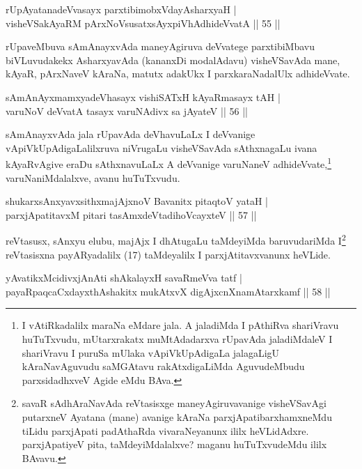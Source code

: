 \begin{shl}
rUpAyatanadeVvasayx parxtibimobxVdayAsharxyaH |\\
visheVSakAyaRM pArxNoV\s susatxsAyxpiVhAdhideVvatA \hfill || 55 ||
\end{shl}

\begin{artha}
rUpaveMbuva sAmAnayxvAda maneyAgiruva deVvatege parxtibiMbavu biVLuvudakekx AsharxyavAda (kananxDi modalAdavu) visheVSavAda mane, kAyaR, pArxNaveV kAraNa, matutx adakUkx I parxkaraNadalUlx adhideVvate.
\end{artha}


\begin{shl}
sAmAnAyxmamxyadeVhasayx vishiSATxH kAyaRmasayx tAH |\\
varuNoV deVvatA tasayx varuNAdivx sa jAyateV \hfill || 56 ||
\end{shl}

\begin{artha}
sAmAnayxvAda jala rUpavAda deVhavuLaLx I deVvanige vApiVkUpAdigaLalilxruva  niVrugaLu visheVSavAda sAthxnagaLu ivana kAyaRvAgive eraDu sAthxnavuLaLx A deVvanige varuNaneV adhideVvate,\footnote{I vAtiRkadalilx maraNa eMdare jala. A jaladiMda I pAthiRva shariVravu huTuTxvudu, mUtarxrakatx muMtAdadarxva rUpavAda jaladiMdaleV I shariVravu I puruSa mUlaka vApiVkUpAdigaLa jalagaLigU kAraNavAguvudu saMGAtavu rakAtxdigaLiMda AguvudeMbudu parxsidadhxveV Agide eMdu BAva.} varuNaniMdalalxve, avanu huTuTxvudu.
\end{artha}

\begin{shl}
shukarxsAnxyavxsithxmajAjxnoV Bavanitx pitaqtoV yataH |\\
parxjApatitavxM pitari tasAmxdeVtadihoVcayxteV \hfill || 57 ||
\end{shl}

\begin{artha}%
reVtasusx, sAnxyu elubu, majAjx I dhAtugaLu taMdeyiMda baruvudariMda I\footnote{savaR sAdhAraNavAda reVtasisxge maneyAgiruvavanige visheVSavAgi putarxneV Ayatana (mane) avanige kAraNa parxjApatibarxhamxneMdu tiLidu parxjApati padAthaRda vivaraNeyanunx ililx heVLidAdxre. parxjApatiyeV pita, taMdeyiMdalalxve? maganu huTuTxvudeMdu ililx BAvavu.} reVtasisxna payARyadalilx (17) taMdeyalilx I parxjAtitavxvanunx heVLide.
\end{artha}

\begin{shl}
yAvatikxMcidivxjAnAti shAkalayxH savaRmeVva tatf |\\
payaRpaqcaCxdayxthAshakitx mukAtxvX digAjxcnXnamAtarxkamf \hfill || 58 ||
\end{shl}

